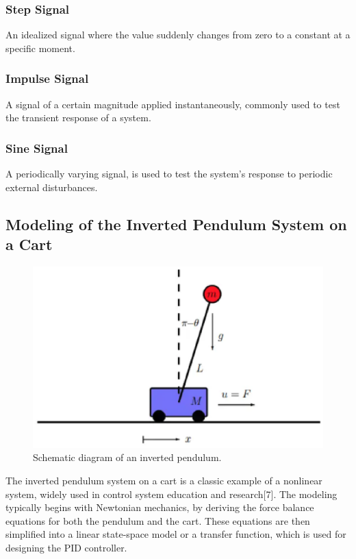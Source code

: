\documentclass[journal,twoside,web]{ieeecolor}
\begin{document}
\subsubsection{Step Signal}
{An idealized signal where the value suddenly changes from zero to a constant at a specific moment.}

\subsubsection{Impulse Signal}
{A signal of a certain magnitude applied instantaneously, commonly used to test the transient response of a system.}

\subsubsection{Sine Signal}
{A periodically varying signal, is used to test the system's response to periodic external disturbances.}


\subsection{Modeling of the Inverted Pendulum System on a Cart}

\begin{figure}[!t]
\centerline{\includegraphics[width=\columnwidth]{Images/Pendulum.eps}}
\caption{Schematic diagram of an inverted pendulum.}
\label{Pendulum}
\end{figure}

The inverted pendulum system on a cart is a classic example of a nonlinear system, widely used in control system education and research[7]. The modeling typically begins with Newtonian mechanics, by deriving the force balance equations for both the pendulum and the cart. These equations are then simplified into a linear state-space model or a transfer function, which is used for designing the PID controller. 
\end{document}
